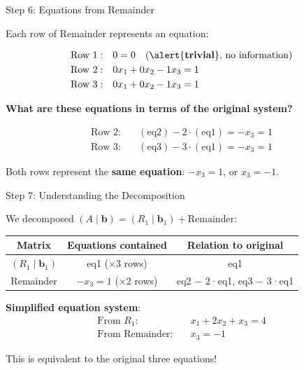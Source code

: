 \documentclass[10pt]{beamer}
\theoremstyle{definition}
\newcommand{\x}[1]{\alert{\textbf{#1}}}
\begin{document}
\begin{frame}{Step 6: Equations from Remainder}

Each row of Remainder represents an equation:

\vspace{0.5em}

\begin{align*}
\text{Row 1}: &\quad 0 = 0 \quad \text{(\x{trivial}, no information)} \\
\text{Row 2}: &\quad 0x_1 + 0x_2 - 1x_3 = 1 \\
\text{Row 3}: &\quad 0x_1 + 0x_2 - 1x_3 = 1
\end{align*}

\vspace{0.5em}

\x{What are these equations in terms of the original system?}

\vspace{0.5em}

\begin{align*}
\text{Row 2}: &\quad (\text{eq2}) - 2 \cdot (\text{eq1}) = -x_3 = 1 \\
\text{Row 3}: &\quad (\text{eq3}) - 3 \cdot (\text{eq1}) = -x_3 = 1
\end{align*}

\vspace{0.5em}

Both rows represent the \x{same equation}: $-x_3 = 1$, or $x_3 = -1$.

\end{frame}

\begin{frame}{Step 7: Understanding the Decomposition}

We decomposed $(A \mid \mathbf{b}) = (R_1 \mid \mathbf{b}_1) + \text{Remainder}$:

\vspace{1em}

\begin{center}
\begin{tabular}{c|c|c}
\textbf{Matrix} & \textbf{Equations contained} & \textbf{Relation to original} \\
\hline
$(R_1 \mid \mathbf{b}_1)$ & eq1 (×3 rows) & eq1 \\
\hline
Remainder & $-x_3 = 1$ (×2 rows) & eq2 $-$ 2·eq1, eq3 $-$ 3·eq1 \\
\end{tabular}
\end{center}

\vspace{1em}

\x{Simplified equation system}:
\begin{align*}
\text{From } R_1: \quad &x_1 + 2x_2 + x_3 = 4 \\
\text{From Remainder}: \quad &x_3 = -1
\end{align*}

\vspace{0.5em}

This is equivalent to the original three equations!

\end{frame}
\end{document}
